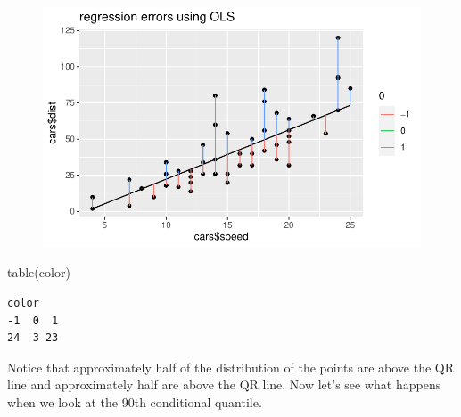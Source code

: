 \documentclass[
  letterpaper,
  DIV=11,
  numbers=noendperiod]{scrreprt}
\newenvironment{Shaded}{\begin{snugshade}}{\end{snugshade}}
\newcommand{\FunctionTok}[1]{\textcolor[rgb]{0.28,0.35,0.67}{#1}}
\newcommand{\NormalTok}[1]{\textcolor[rgb]{0.00,0.23,0.31}{#1}}
\begin{document}
\begin{figure}[H]

{\centering \includegraphics{methods_files/figure-pdf/unnamed-chunk-2-1.pdf}

}

\end{figure}

\begin{Shaded}
\begin{Highlighting}[]
\FunctionTok{table}\NormalTok{(color)}
\end{Highlighting}
\end{Shaded}

\begin{verbatim}
color
-1  0  1 
24  3 23 
\end{verbatim}

Notice that approximately half of the distribution of the points are
above the QR line and approximately half are above the QR line. Now
let's see what happens when we look at the 90th conditional quantile.
\end{document}
